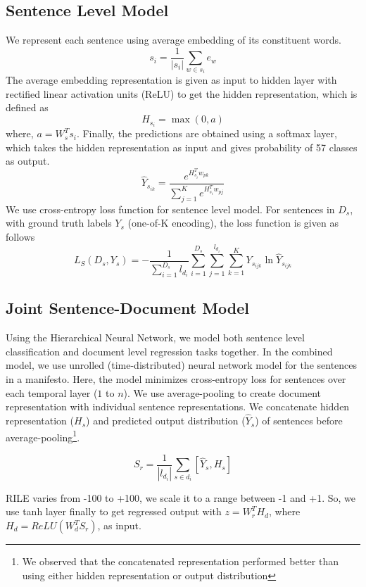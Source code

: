 \documentclass[11pt,a4paper]{article}
\begin{document}
\subsection{Sentence Level Model}
We represent each sentence using average embedding of its constituent words.
\[ s_{i} = \frac{1}{|s_{i}|}\sum_{w \in s_{i}} e_{w} \]
The average embedding representation is given as input to hidden layer with rectified linear activation units (ReLU) to get the hidden representation, which is defined as 
\[H_{s_{i}}= \max(0,a)\] where, $a = W_{s}^{T}s_{i}$. Finally, the predictions are obtained using a softmax layer, which takes the hidden representation as input and gives probability of 57 classes as output.
\[ \hat{Y}_{s_{ik}} = \frac{e^{H_{s_{i}}^T w_{pk}}}{\sum_{j=1}^{K}{e^{H_{s_{i}}^T w_{pj}}}}\]
We use cross-entropy loss function for sentence level model. For sentences in $D_{s}$, with ground truth labels $Y_{s}$ (one-of-K encoding), the loss function is given as follows
\begin{equation}
L_{S}(D_{s},Y_{s})=-\frac{1}{\sum_{i=1}^{D_{s}}l_{d_{i}}}\sum_{i=1}^{D_{s}}\sum_{j=1}^{l_{d_{i}}}\sum_{k=1}^{K} Y_{s_{ijk}} \ln \hat{Y}_{s_{ijk}}  
\end{equation}
\subsection{Joint Sentence-Document Model}
Using the Hierarchical Neural Network, we model both sentence level classification and document level regression tasks together. In the combined model, we use unrolled (time-distributed) neural network model for the sentences in a manifesto. Here, the model minimizes cross-entropy loss for sentences over each temporal layer ($1$ to $n$). We use average-pooling to create document representation with individual sentence representations. We concatenate hidden representation ($H_{s}$) and predicted output distribution ($\hat{Y}_{s}$) of sentences before average-pooling\footnote{We observed that the concatenated representation performed better than using either hidden representation or output distribution}.

\[ S_{r} = \frac{1}{|l_{d_{i}}|}\sum_{s \in d_{i}} [\hat{Y}_{s}, H_{s}] \]

RILE varies from -100 to +100, we scale it to a range between -1 and +1. So, we use tanh layer finally to get regressed output with $z = W_{r}^{T}H_{d}$, where $H_{d} = ReLU(W_{d}^{T}S_{r})$, as input.
\end{document}
